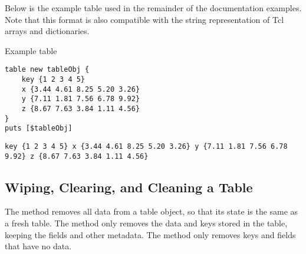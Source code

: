\documentclass{article}
\begin{document}
Below is the example table used in the remainder of the documentation examples.
Note that this format is also compatible with the string representation of Tcl arrays and dictionaries.
\begin{example}{Example table}
\begin{lstlisting}
table new tableObj {
    key {1 2 3 4 5} 
    x {3.44 4.61 8.25 5.20 3.26}
    y {7.11 1.81 7.56 6.78 9.92}
    z {8.67 7.63 3.84 1.11 4.56}
}
puts [$tableObj]
\end{lstlisting}
\tcblower
\begin{lstlisting}
key {1 2 3 4 5} x {3.44 4.61 8.25 5.20 3.26} y {7.11 1.81 7.56 6.78 9.92} z {8.67 7.63 3.84 1.11 4.56}
\end{lstlisting}
\end{example}

\subsection{Wiping, Clearing, and Cleaning a Table}
The method  removes all data from a table object, so that its state is the same as a fresh table.
The method  only removes the data and keys stored in the table, keeping the fields and other metadata.
The method  only removes keys and fields that have no data.
\begin{syntax}
\end{syntax}
\begin{syntax}
\end{syntax}
\begin{syntax}
\end{syntax}


\clearpage
\end{document}
